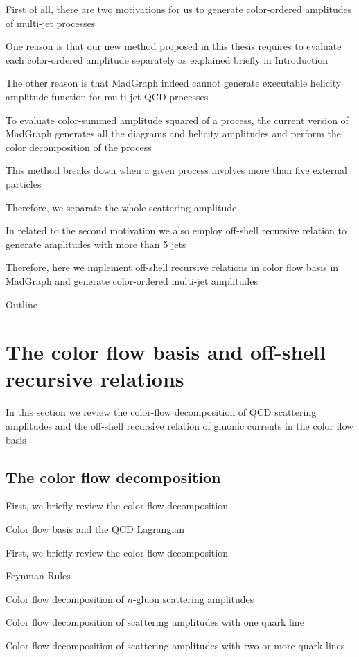 \documentclass{book}
\begin{document}
First of all, there are two motivations for us to generate color-ordered amplitudes of multi-jet processes

One reason is that our new method proposed in this thesis requires to evaluate each color-ordered amplitude separately as explained briefly in Introduction

The other reason is that MadGraph indeed cannot generate executable helicity amplitude function for multi-jet QCD processes

To evaluate color-summed amplitude squared of a process, the current version of MadGraph generates all the diagrams and helicity amplitudes and perform the color decomposition of the process

This method breaks down when a given process involves more than five external particles

Therefore, we separate the whole scattering amplitude

In related to the second motivation we also employ off-shell recursive relation to generate amplitudes with more than 5 jets

Therefore, here we implement off-shell recursive relations in color flow basis in MadGraph and generate color-ordered multi-jet amplitudes

Outline

\section{The color flow basis and off-shell recursive relations}
In this section we review the color-flow decomposition of QCD scattering amplitudes and the off-shell recursive relation of gluonic currents in the color flow basis

\subsection{The color flow decomposition}
First, we briefly review the color-flow decomposition 

Color flow basis and the QCD Lagrangian

First, we briefly review the color-flow decomposition

Feynman Rules

Color flow decomposition of $n$-gluon scattering amplitudes

Color flow decomposition of scattering amplitudes with one quark line

Color flow decomposition of scattering amplitudes with two or more quark lines
\end{document}
